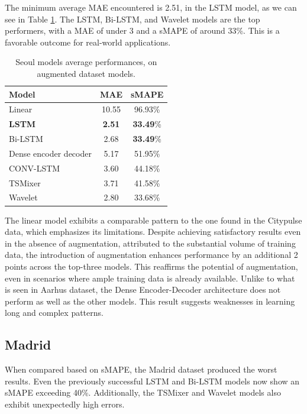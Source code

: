 The minimum average MAE encountered is 2.51, in the LSTM model, as we can see in Table \ref{tab:Seoul performances}.
The LSTM, Bi-LSTM, and Wavelet models are the top performers, with a MAE of under 3 and a sMAPE of around 33\%. This is a favorable outcome for real-world applications.

\begin{table}[h]
    \centering
    \begin{tabular}{lcc}
        \toprule
        \textbf{Model} & \textbf{MAE} & \textbf{sMAPE} \\ 
        \midrule
        Linear & 10.55 & 96.93\% \\
        \textbf{LSTM} & \textbf{2.51} & \textbf{33.49}\% \\
        Bi-LSTM & 2.68 & \textbf{33.49}\% \\
        Dense encoder decoder & 5.17 & 51.95\% \\
        CONV-LSTM & 3.60 & 44.18\% \\
        TSMixer & 3.71 & 41.58\% \\
        Wavelet & 2.80 & 33.68\% \\
        \bottomrule
    \end{tabular}
    \caption{Seoul models average performances, on augmented dataset models.}
    \label{tab:Seoul performances}
\end{table}

The linear model exhibits a comparable pattern to the one found in the Citypulse data, which emphasizes its limitations. Despite achieving satisfactory results even in the absence of augmentation, attributed to the substantial volume of training data, the introduction of augmentation enhances performance by an additional 2 points across the top-three models. This reaffirms the potential of augmentation, even in scenarios where ample training data is already available.
Unlike to what is seen in Aarhus dataset, the Dense Encoder-Decoder architecture does not perform as well as the other models. This result suggests weaknesses in learning long and complex patterns.

\subsection{Madrid}

When compared based on sMAPE, the Madrid dataset produced the worst results. Even the previously successful LSTM and Bi-LSTM models now show an sMAPE exceeding 40\%. Additionally, the TSMixer and Wavelet models also exhibit unexpectedly high errors.

